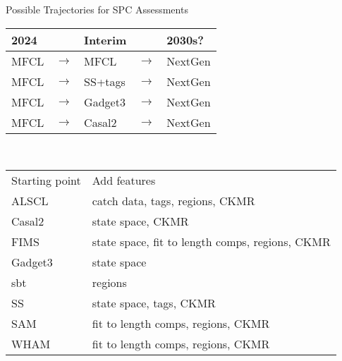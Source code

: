 \documentclass[aspectratio=169,fleqn]{beamer}
\begin{document}
\begin{frame}{Possible Trajectories for SPC Assessments}\small
  \begin{tabular}{lllll}
    \hline
    2024 & ~ & Interim & ~ & 2030s?\\
    \hline
    MFCL & $\rightarrow$ & MFCL    & $\rightarrow$ & NextGen\\
    MFCL & $\rightarrow$ & SS+tags & $\rightarrow$ & NextGen\\
    MFCL & $\rightarrow$ & Gadget3 & $\rightarrow$ & NextGen\\
    MFCL & $\rightarrow$ & Casal2  & $\rightarrow$ & NextGen\\
    \hline
  \end{tabular}
  ~\\\vspace{1ex}
  \begin{tabular}{ll}
    Starting point & Add features\\
    ALSCL          & catch data, tags, regions, CKMR\\
    Casal2         & state space, CKMR\\
    FIMS           & state space, fit to length comps, regions, CKMR\\
    Gadget3        & state space\\
    sbt            & regions\\
    SS             & state space, tags, CKMR\\
    SAM            & fit to length comps, regions, CKMR\\
    WHAM           & fit to length comps, regions, CKMR\\
  \end{tabular}
\end{frame}

\end{document}
